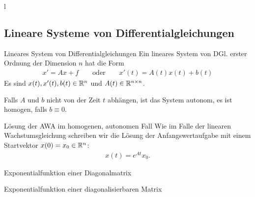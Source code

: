 l%
\subsection{Lineare Systeme von Differentialgleichungen}
\frame{\subtoc}

  

\begin{frame}
  \begin{block}{Lineares System von Differentialgleichungen}
    Ein lineares System von DGl. erster Ordnung der Dimension $n$ hat
    die Form
    \begin{gather*}
      x' = Ax + f
      \qquad\text{oder}\qquad
      x'(t) = A(t)x(t) + b(t)
    \end{gather*}
    Es sind $x(t), x'(t), b(t) \in \mathbb R^n$ und $A(t)\in \mathbb R^{n\times n}$.
    
    Falls $A$ und $b$ nicht von der Zeit $t$ abhängen, ist das System
    autonom, es ist homogen, falls $b\equiv0$.
  \end{block}

  \begin{block}{Lösung der AWA im homogenen, autonomen Fall}
    Wie im Falle der linearen Wachstumsgleichung schreiben wir die
    Lösung der Anfangswertaufgabe mit einem Startvektor $x(0) = x_0\in\mathbb R^n$:
    \begin{gather*}
      x(t) = e^{At} x_0.
    \end{gather*}
  \end{block}
\end{frame}

\begin{frame}{Exponentialfunktion einer Diagonalmatrix}
\end{frame}

\begin{frame}{Exponentialfunktion einer diagonalisierbaren Matrix}
  
\end{frame}

